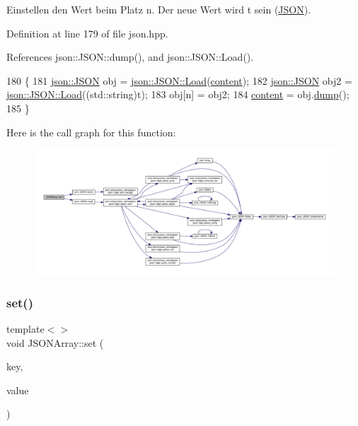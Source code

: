 Einstellen den Wert beim Platz n. Der neue Wert wird t sein (\mbox{\hyperlink{class_j_s_o_n}{J\+S\+ON}}). 

Definition at line 179 of file json.\+hpp.



References json\+::\+J\+S\+O\+N\+::dump(), and json\+::\+J\+S\+O\+N\+::\+Load().


\begin{DoxyCode}
180 \{
181         \mbox{\hyperlink{classjson_1_1_j_s_o_n}{json::JSON}} obj = \mbox{\hyperlink{classjson_1_1_j_s_o_n_a799ab1cc68cb6e2a41ec948a9a2ecc37}{json::JSON::Load}}(\mbox{\hyperlink{class_j_s_o_n_ad1ace77234b963a2994178ce7f76a181}{content}});
182         \mbox{\hyperlink{classjson_1_1_j_s_o_n}{json::JSON}} obj2 = \mbox{\hyperlink{classjson_1_1_j_s_o_n_a799ab1cc68cb6e2a41ec948a9a2ecc37}{json::JSON::Load}}((std::string)t);
183         obj[n] = obj2;
184         \mbox{\hyperlink{class_j_s_o_n_ad1ace77234b963a2994178ce7f76a181}{content}} = obj.\mbox{\hyperlink{classjson_1_1_j_s_o_n_acb99af0df2045a504f6bbc08bf5c4990}{dump}}();
185 \}
\end{DoxyCode}
Here is the call graph for this function\+:
\nopagebreak
\begin{figure}[H]
\begin{center}
\leavevmode
\includegraphics[width=350pt]{class_j_s_o_n_array_a40043037244507bd344c9cae26962bde_cgraph}
\end{center}
\end{figure}
\mbox{\label{class_j_s_o_n_array_a6cbff0aa889890a84af41d6f5eae23f2}} 
\subsubsection{\texorpdfstring{set()}{set()}\hspace{0.1cm}{\footnotesize\ttfamily [3/4]}}
{\footnotesize\ttfamily template$<$$>$ \\
void J\+S\+O\+N\+Array\+::set (\begin{DoxyParamCaption}\item[{int}]{key,  }\item[{\mbox{\hyperlink{class_j_s_o_n_object}{J\+S\+O\+N\+Object}}}]{value }\end{DoxyParamCaption})\hspace{0.3cm}{\ttfamily [inline]}}

